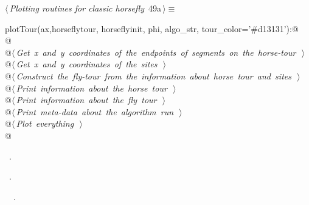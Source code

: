 \documentclass[11.5pt]{report}
\begin{document}
\begin{flushleft} \small\label{scrap73}\raggedright\small
{} $\langle\,${\itshape Plotting routines for classic horsefly}\nobreak\ {\footnotesize {49a}}$\,\rangle\equiv$
\vspace{-1ex}
\begin{list}{}{} \item
\mbox{}\verb@def plotTour(ax,horseflytour, horseflyinit, phi, algo_str, tour_color='#d13131'):@\\
\mbox{}\verb@   @\\
\mbox{}\verb@    @\hbox{$\langle\,${\itshape Get x and y coordinates of the endpoints of segments on the horse-tour}\nobreak\ {\footnotesize {}}$\,\rangle$}\verb@@\\
\mbox{}\verb@    @\hbox{$\langle\,${\itshape Get x and y coordinates of the sites}\nobreak\ {\footnotesize {}}$\,\rangle$}\verb@@\\
\mbox{}\verb@    @\hbox{$\langle\,${\itshape Construct the fly-tour from the information about horse tour and sites}\nobreak\ {\footnotesize {}}$\,\rangle$}\verb@@\\
\mbox{}\verb@    @\hbox{$\langle\,${\itshape Print information about the horse tour}\nobreak\ {\footnotesize {}}$\,\rangle$}\verb@@\\
\mbox{}\verb@    @\hbox{$\langle\,${\itshape Print information about the fly tour}\nobreak\ {\footnotesize {}}$\,\rangle$}\verb@@\\
\mbox{}\verb@    @\hbox{$\langle\,${\itshape Print meta-data about the algorithm run}\nobreak\ {\footnotesize {}}$\,\rangle$}\verb@@\\
\mbox{}\verb@    @\hbox{$\langle\,${\itshape Plot everything}\nobreak\ {\footnotesize {}}$\,\rangle$}\verb@@\\
\mbox{}\verb@    @{\NWsep}
\end{list}
\vspace{-1.5ex}
\footnotesize
\begin{list}{}{\setlength{\itemsep}{-\parsep}\setlength{\itemindent}{-\leftmargin}}
\item \NWtxtMacroDefBy\ .
\item \NWtxtMacroRefIn\ .
\item \NWtxtIdentsDefed\nobreak\  \verb@plotTour@\nobreak\ .
\item{}
\end{list}
\vspace{4ex}
\end{flushleft}
\end{document}
